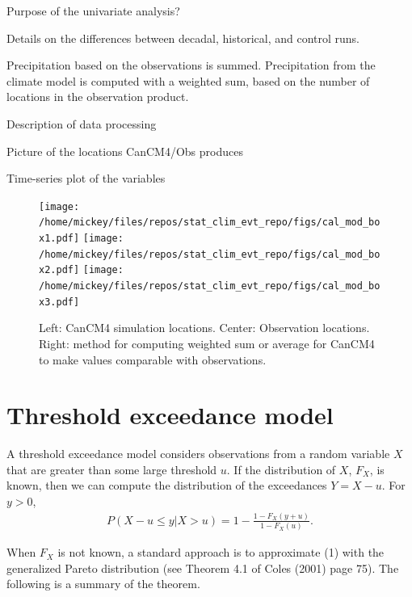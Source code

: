 \documentclass[12pt]{article}
\begin{document}
Purpose of the univariate analysis?
\bigskip

Details on the differences between decadal, historical, and control runs.
\bigskip

Precipitation based on the observations is summed. Precipitation from the climate model is computed with a weighted sum, based on the number of locations in the observation product.
\bigskip

Description of data processing
\bigskip

Picture of the locations CanCM4/Obs produces
\bigskip

Time-series plot of the variables
\bigskip

\begin{figure}
\begin{center}
\texttt{[image: /home/mickey/files/repos/stat\_clim\_evt\_repo/figs/cal\_mod\_box1.pdf]}
\texttt{[image: /home/mickey/files/repos/stat\_clim\_evt\_repo/figs/cal\_mod\_box2.pdf]}
\texttt{[image: /home/mickey/files/repos/stat\_clim\_evt\_repo/figs/cal\_mod\_box3.pdf]}
\end{center}
\caption{Left: CanCM4 simulation locations. Center: Observation locations. Right: method for computing weighted sum or average for CanCM4 to make values comparable with observations.}
\end{figure}
 
\section{Threshold exceedance model}

A threshold exceedance model considers observations from a random variable $X$ that are greater than some large threshold $u$. If the distribution of $X$, $F_X$, is known, then we can compute the distribution of the exceedances $Y=X-u$. For $y>0$,
\begin{align}
P(X-u\leq y| X > u) = 1-\frac{1-F_X(y+u)}{1-F_X(u)}.
\end{align}

When $F_X$ is not known, a standard approach is to approximate (1) with the generalized Pareto distribution (see Theorem 4.1 of Coles (2001) page 75). The following is a summary of the theorem.
\bigskip
\end{document}
